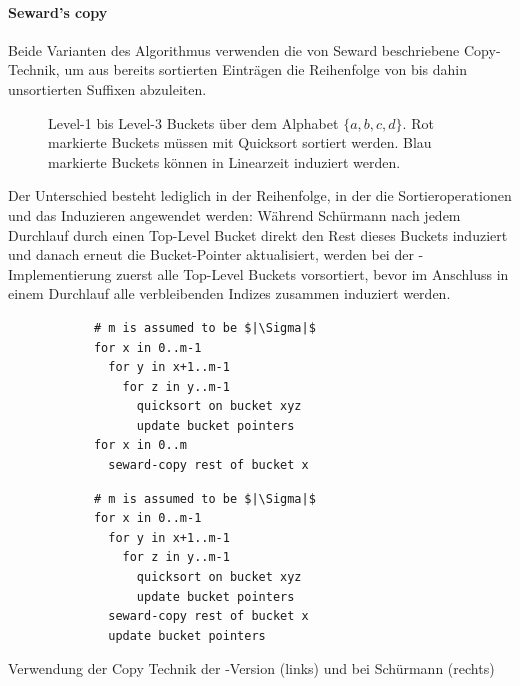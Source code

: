\paragraph{Seward's copy}
\label{bpr:seward}
Beide Varianten des Algorithmus verwenden die von Seward \cite{seward2000} beschriebene Copy-Technik, um aus bereits sortierten Einträgen die Reihenfolge von bis dahin unsortierten Suffixen abzuleiten. 
\begin{figure}[ht]
    \caption[Funktionsweise der Copy-Technik]{Level-1 bis Level-3 Buckets über dem Alphabet \(\{a, b, c, d\}\). Rot markierte Buckets müssen mit Quicksort sortiert werden. Blau markierte Buckets können in Linearzeit induziert werden.}
	\label{fig:seward}
\end{figure}
Der Unterschied besteht lediglich in der Reihenfolge, in der die Sortieroperationen und das Induzieren angewendet werden: Während Schürmann nach jedem Durchlauf durch einen Top-Level Bucket direkt den Rest dieses Buckets induziert und danach erneut die Bucket-Pointer aktualisiert, werden bei der \sacabench-Implementierung zuerst alle Top-Level Buckets vorsortiert, bevor im Anschluss in einem Durchlauf alle verbleibenden Indizes zusammen induziert werden. 
\begin{listing}[h]
    \begin{minipage}{0.5\textwidth}
        \begin{verbatim}
            # m is assumed to be $|\Sigma|$
            for x in 0..m-1
              for y in x+1..m-1
                for z in y..m-1
                  quicksort on bucket xyz
                  update bucket pointers
            for x in 0..m
              seward-copy rest of bucket x
        \end{verbatim}
    \end{minipage}
    \begin{minipage}{0.5\textwidth}
        \begin{verbatim}
            # m is assumed to be $|\Sigma|$
            for x in 0..m-1
              for y in x+1..m-1
                for z in y..m-1
                  quicksort on bucket xyz
                  update bucket pointers
              seward-copy rest of bucket x
              update bucket pointers
        \end{verbatim}
    \end{minipage}
    \caption[Verwendung der Copy Technik]{Verwendung der Copy Technik der \sacabench-Version (links) und bei Schürmann (rechts)}
\end{listing}
